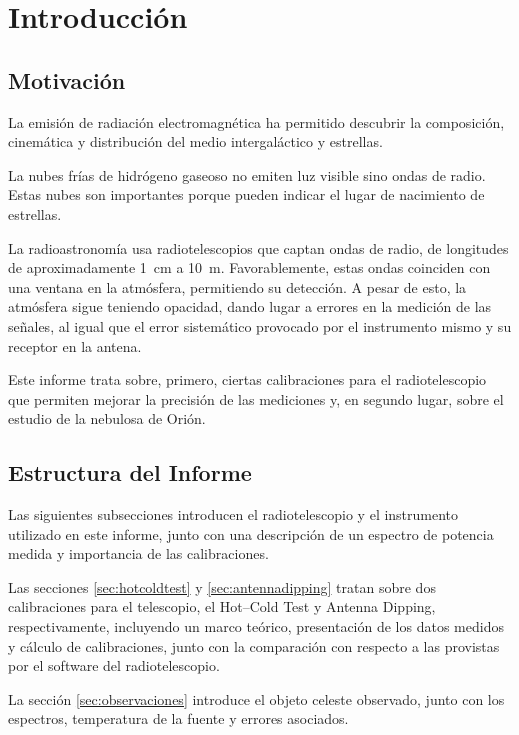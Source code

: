 \section{Introducción}

\subsection{Motivación}

La emisión de radiación electromagnética ha permitido descubrir la composición, cinemática y distribución del medio intergaláctico y estrellas.

La nubes frías de hidrógeno gaseoso no emiten luz visible sino ondas de radio. Estas nubes son importantes porque pueden indicar el lugar de nacimiento de estrellas.

La radioastronomía usa radiotelescopios que captan ondas de radio, de longitudes de aproximadamente \SI{1}{\centi\meter} a \SI{10}{\meter}. Favorablemente, estas ondas coinciden con una ventana en la atmósfera, permitiendo su detección. A pesar de esto, la atmósfera sigue teniendo opacidad, dando lugar a errores en la medición de las señales, al igual que el error sistemático provocado por el instrumento mismo y su receptor en la antena.

Este informe trata sobre, primero, ciertas calibraciones para el radiotelescopio que permiten mejorar la precisión de las mediciones y, en segundo lugar, sobre el estudio de la nebulosa de Orión.

\subsection{Estructura del Informe}

Las siguientes subsecciones introducen el radiotelescopio y el instrumento utilizado en este informe, junto con una descripción de un espectro de potencia medida y importancia de las calibraciones.

Las secciones \ref{sec:hotcoldtest} y \ref{sec:antennadipping} tratan sobre dos calibraciones para el telescopio, el Hot--Cold Test y Antenna Dipping, respectivamente, incluyendo un marco teórico, presentación de los datos medidos y cálculo de calibraciones, junto con la comparación con respecto a las provistas por el software del radiotelescopio.

La sección \ref{sec:observaciones} introduce el objeto celeste observado, junto con los espectros, temperatura de la fuente y errores asociados.

